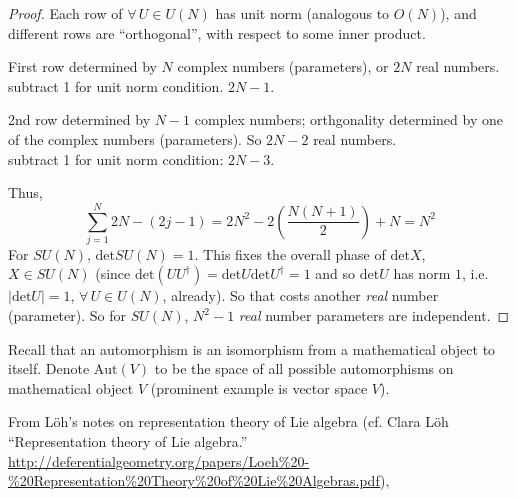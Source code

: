 \documentclass[10pt]{amsart}
\begin{document}
\begin{multicols}{2}
\begin{proof}
Each row of $\forall \, U \in U(N)$ has unit norm (analogous to $O(N)$), and different rows are ``orthogonal'', with respect to some inner product.  

First row determined by $N$ complex numbers (parameters), or $2N$ real numbers.  \\
\phantom{First} subtract 1 for unit norm condition.  $2N-1$.  

2nd row determined by $N-1$ complex numbers; orthgonality determined by one of the complex numbers (parameters).  So $2N-2$ real numbers. \\
\phantom{First} subtract 1 for unit norm condition: $2N-3$.  

Thus,
\[
\sum_{j=1}^N 2N - (2j - 1) = 2N^2 - 2\left( \frac{N(N+1)}{2} \right)  + N = N^2
\]
For $SU(N)$, $\text{det}SU(N) =1$.  This fixes the overall phase of $\text{det}X$, $X\in SU(N)$ (since $\text{det}(UU^{\dag}) = \text{det}U \text{det}U^{\dag} = 1$ and so $\text{det}U$ has norm $1$, i.e. $|\text{det}U|=1$, $\forall \, U \in U(N)$, already).  So that costs another \emph{real} number (parameter).  So for $SU(N)$, $N^2-1$ \emph{real} number parameters are independent.  

\end{proof}

Recall that an automorphism is an isomorphism from a mathematical object to itself.  Denote $\text{Aut}(V)$ to be the space of all possible automorphisms on mathematical object $V$ (prominent example is vector space $V$).  


From L\"{o}h's notes on representation theory of Lie algebra (cf. Clara L\"{o}h ``Representation theory of Lie algebra.''  \url{http://deferentialgeometry.org/papers/Loeh%20-%20Representation%20Theory%20of%20Lie%20Algebras.pdf}), 


\end{multicols}
\end{document}
